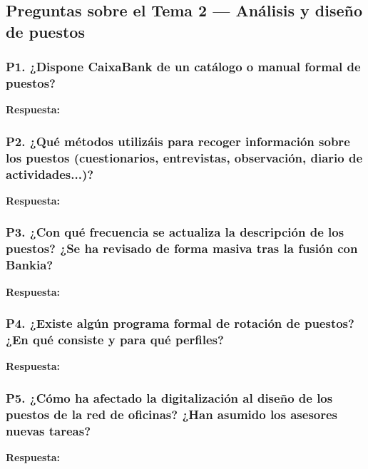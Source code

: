 \subsection{Preguntas sobre el Tema 2 — Análisis y diseño de puestos}

\subsubsection*{P1. ¿Dispone CaixaBank de un catálogo o manual formal de puestos?}

\textbf{Respuesta:}

\subsubsection*{P2. ¿Qué métodos utilizáis para recoger información sobre los puestos
(cuestionarios, entrevistas, observación, diario de actividades...)?}

\textbf{Respuesta:}\newline
[...]

\subsubsection*{P3. ¿Con qué frecuencia se actualiza la descripción de los puestos?
¿Se ha revisado de forma masiva tras la fusión con Bankia?}

\textbf{Respuesta:}\newline
[...]

\subsubsection*{P4. ¿Existe algún programa formal de rotación de puestos?
¿En qué consiste y para qué perfiles?}

\textbf{Respuesta:}\newline
[...]

\subsubsection*{P5. ¿Cómo ha afectado la digitalización al diseño de los puestos
de la red de oficinas? ¿Han asumido los asesores nuevas tareas?}

\textbf{Respuesta:}\newline
[...]

